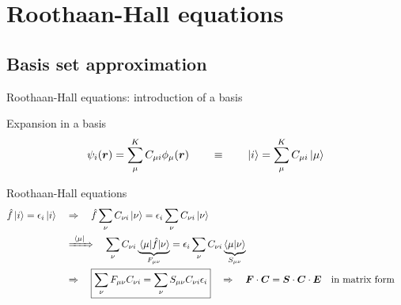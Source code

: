 \documentclass[aspectratio=169,9pt]{beamer}
\newcommand{\br}{\boldsymbol{r}}
\newcommand{\bC}{\boldsymbol{C}}
\newcommand{\bE}{\boldsymbol{E}}
\newcommand{\bS}{\boldsymbol{S}}
\newcommand{\bF}{\boldsymbol{F}}
\newcommand{\hf}{\Hat{f}}
\newcommand{\orange}[1]{\textcolor{hfOrange}{#1}}
\newcommand{\blue}[1]{\textcolor{hfBlue}{#1}}
\begin{document}
\section{Roothaan-Hall equations}
\subsection{Basis set approximation}
\begin{frame}{Roothaan-Hall equations: introduction of a basis}
	\begin{block}{Expansion in a basis}
		$$ \psi_i(\br) = \sum_\mu^K C_{\mu i} \phi_{\mu}(\br)	
		\qquad \equiv	\qquad
		\ket{i} = \sum_\mu^K C_{\mu i} \ket{\mu}$$
	\end{block}
	\begin{block}{Roothaan-Hall equations}
			\begin{equation*}
			\begin{split}
				\hf \ket{i} = \epsilon_i \ket{i}
				&  \quad	\Rightarrow	\quad
				\hf \sum_{\nu} C_{\nu i} \ket{\nu} = \epsilon_i \sum_{\nu} C_{\nu i} \ket{\nu}
				\\
				& \quad\xRightarrow{\ \bra{\mu}\ }\quad
				\sum_{\nu} C_{\nu i} \underbrace{\mel{ \mu }{ \hf }{ \nu }}_{F_{\mu \nu}}
				= \epsilon_i \sum_{\nu} C_{\nu i} \underbrace{\braket{ \mu }{ \nu }}_{S_{\mu \nu}}
				\\
				& \quad	\Rightarrow	\quad
				 \boxed{\sum_{\nu} F_{\mu \nu}  C_{\nu i} = \sum_{\nu}  S_{\mu \nu} C_{\nu i} \epsilon_i }
				\quad	\Rightarrow	\quad
				 \bF \cdot \bC = \bS \cdot \bC \cdot \bE 
				 \qq{in matrix form}
			\end{split}
			\end{equation*}
	\end{block}
\end{frame}
\end{document}
